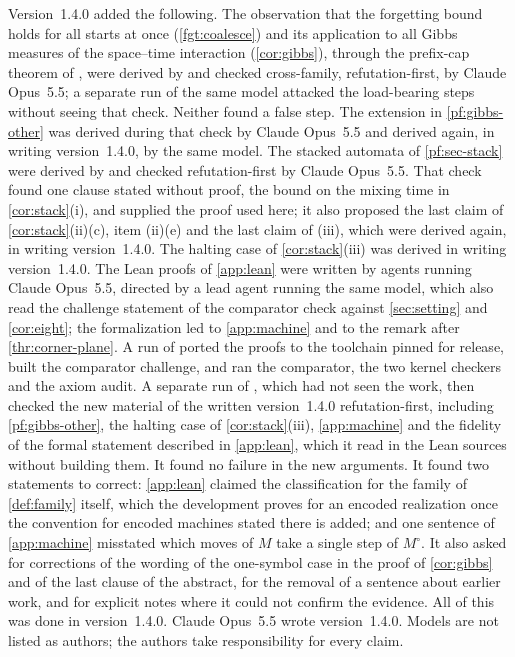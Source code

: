 Version~1.4.0 added the following. The observation that the forgetting bound holds for all starts at once (\cref{fgt:coalesce}) and its application to all Gibbs measures of the space--time interaction (\cref{cor:gibbs}), through the prefix-cap theorem of \cite{DM26}, were derived by \OPENAIMODEL{} and checked cross-family, refutation-first, by Claude Opus~5.5; a separate run of the same model attacked the load-bearing steps without seeing that check. Neither found a false step. The extension in \cref{pf:gibbs-other} was derived during that check by Claude Opus~5.5 and derived again, in writing version~1.4.0, by the same model. The stacked automata of \cref{pf:sec-stack} were derived by \OPENAIMODEL{} and checked refutation-first by Claude Opus~5.5. That check found one clause stated without proof, the bound on the mixing time in \cref{cor:stack}(i), and supplied the proof used here; it also proposed the last claim of \cref{cor:stack}(ii)(c), item (ii)(e) and the last claim of (iii), which were derived again, in writing version~1.4.0. The halting case of \cref{cor:stack}(iii) was derived in writing version~1.4.0. The Lean proofs of \cref{app:lean} were written by agents running Claude Opus~5.5, directed by a lead agent running the same model, which also read the challenge statement of the comparator check against \cref{sec:setting} and \cref{cor:eight}; the formalization led to \cref{app:machine} and to the remark after \cref{thr:corner-plane}. A run of \OPENAIMODEL{} ported the proofs to the toolchain pinned for release, built the comparator challenge, and ran the comparator, the two kernel checkers and the axiom audit. A separate run of \OPENAIMODEL{}, which had not seen the work, then checked the new material of the written version~1.4.0 refutation-first, including \cref{pf:gibbs-other}, the halting case of \cref{cor:stack}(iii), \cref{app:machine} and the fidelity of the formal statement described in \cref{app:lean}, which it read in the Lean sources without building them. It found no failure in the new arguments. It found two statements to correct: \cref{app:lean} claimed the classification for the family of \cref{def:family} itself, which the development proves for an encoded realization once the convention for encoded machines stated there is added; and one sentence of \cref{app:machine} misstated which moves of $M$ take a single step of $M^\circ$. It also asked for corrections of the wording of the one-symbol case in the proof of \cref{cor:gibbs} and of the last clause of the abstract, for the removal of a sentence about earlier work, and for explicit notes where it could not confirm the evidence. All of this was done in version~1.4.0. Claude Opus~5.5 wrote version~1.4.0. Models are not listed as authors; the authors take responsibility for every claim.

